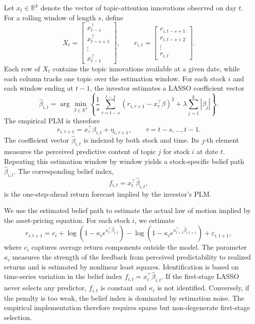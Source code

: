 Let $x_t \in \mathbb{R}^k$ denote the vector of topic-attention innovations observed on
day $t$. For a rolling window of length $s$, define
\begin{equation}
X_t
=
\begin{bmatrix}
x_{t-s}^\top \\
x_{t-s+1}^\top \\
\vdots \\
x_{t-1}^\top
\end{bmatrix},
\qquad
r_{i,t}
=
\begin{bmatrix}
r_{i,t-s+1} \\
r_{i,t-s+2} \\
\vdots \\
r_{i,t}
\end{bmatrix}.
\end{equation}
Each row of $X_t$ contains the topic innovations available at a given date, while each
column tracks one topic over the estimation window. For each stock $i$ and each window
ending at $t-1$, the investor estimates a LASSO coefficient vector
\begin{equation}
\hat{\beta}_{i,t}
=
\arg\min_{\beta \in \mathbb{R}^k}
\left\{
\frac{1}{s}
\sum_{\tau=t-s}^{t-1}
\left(r_{i,\tau+1}-x_\tau^\top \beta\right)^2
+
\lambda \sum_{j=1}^{k} |\beta_j|
\right\}.
\end{equation}
The empirical PLM is therefore
\begin{equation}\label{eq:empirical_plm}
r_{i,\tau+1}
=
x_\tau^\top \beta_{i,t}
+
\eta_{i,\tau+1},
\qquad
\tau=t-s,\ldots,t-1.
\end{equation}
The coefficient vector $\hat{\beta}_{i,t}$ is indexed by both stock and time. Its
$j$-th element measures the perceived predictive content of topic $j$ for stock $i$ at
date $t$. Repeating this estimation window by window yields a stock-specific belief path
$\hat{\beta}_{i,t}$. The corresponding belief index,
\[
    f_{i,t} = x_t^\top \hat{\beta}_{i,t},
\]
is the one-step-ahead return forecast implied by the investor's PLM.

We use the estimated belief path to estimate the actual law of motion implied by the
asset-pricing equation. For each stock $i$, we estimate
\begin{equation}\label{eq:empirical_alm}
r_{i,t+1}
=
c_i
+
\log\!\left(1-\kappa_i e^{x_t^\top \hat{\beta}_{i,t}}\right)
-
\log\!\left(1-\kappa_i e^{x_{t+1}^\top \hat{\beta}_{i,t+1}}\right)
+
\varepsilon_{i,t+1},
\end{equation}
where $c_i$ captures average return components outside the model. The parameter
$\kappa_i$ measures the strength of the feedback from perceived predictability to realized
returns and is estimated by nonlinear least squares. Identification is based on time-series
variation in the belief index $f_{i,t}=x_t^\top\hat{\beta}_{i,t}$. If the first-stage LASSO never
selects any predictor, $f_{i,t}$ is constant and $\kappa_i$ is not identified. Conversely, if the
penalty is too weak, the belief index is dominated by estimation noise. The empirical
implementation therefore requires sparse but non-degenerate first-stage selection.

